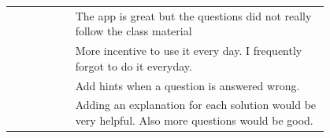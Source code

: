 \begin{longtable}{r|p{0.8\linewidth}}
		& The app is great but the questions did not really follow the class material                                                                                                                                                                                                                                                                                                                                                                                                                                                                                                                                                                                                                                                                      \\
		& More incentive to use it every day. I frequently forgot to do it everyday.                                                                                                                                                                                                                                                                                                                                                                                                                                                                                                                                                                                                                                                                       \\
		& Add hints when a question is answered wrong.                                                                                                                                                                                                                                                                                                                                                                                                                                                                                                                                                                                                                                                                                                     \\
		& Adding an explanation for each solution would be very helpful.  Also more questions would be good.                                                                                                                                                                                                                                                                                                                                                                                                                                                                                                                                                                                                                                               \\

\end{longtable}
